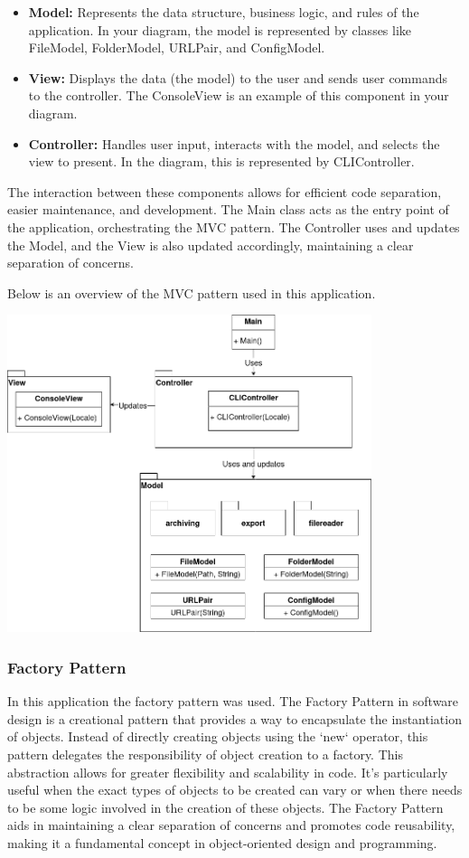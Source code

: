\begin{itemize}
    \item \textbf{Model:} Represents the data structure, business logic, and rules of the application. In your diagram, the model is represented by classes like FileModel, FolderModel, URLPair, and ConfigModel.
    \item \textbf{View:} Displays the data (the model) to the user and sends user commands to the controller. The ConsoleView is an example of this component in your diagram.
    \item \textbf{Controller:} Handles user input, interacts with the model, and selects the view to present. In the diagram, this is represented by CLIController.
    
\end{itemize}

The interaction between these components allows for efficient code separation, easier maintenance, and development. The Main class acts as the entry point of the application, orchestrating the MVC pattern. The Controller uses and updates the Model, and the View is also updated accordingly, maintaining a clear separation of concerns.

Below is an overview of the MVC pattern used in this application.
\vskip 0.3cm
\begin{center}
    \includegraphics[width=0.8\textwidth]{diagrams/mvc_diagram-Highlevel_MVC.png}
\end{center}
\clearpage

\subsubsection{Factory Pattern}
In this application the factory pattern was used.
The Factory Pattern in software design is a creational pattern that provides a way to encapsulate the instantiation of objects. Instead of directly creating objects using the `new` operator, this pattern delegates the responsibility of object creation to a factory. This abstraction allows for greater flexibility and scalability in code. It's particularly useful when the exact types of objects to be created can vary or when there needs to be some logic involved in the creation of these objects. The Factory Pattern aids in maintaining a clear separation of concerns and promotes code reusability, making it a fundamental concept in object-oriented design and programming.

